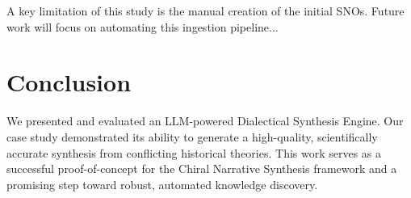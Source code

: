 \documentclass[twocolumn, 10pt]{article}
\begin{document}
A key limitation of this study is the manual creation of the initial SNOs. Future work will focus on automating this ingestion pipeline...

\section{Conclusion}
\label{sec:conclusion}
We presented and evaluated an LLM-powered Dialectical Synthesis Engine. Our case study demonstrated its ability to generate a high-quality, scientifically accurate synthesis from conflicting historical theories. This work serves as a successful proof-of-concept for the Chiral Narrative Synthesis framework and a promising step toward robust, automated knowledge discovery.

\printbibliography
\end{document}
